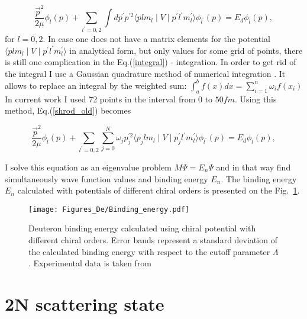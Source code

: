     \begin{equation}
        \frac{\vec{p}^2}{2\mu} \phi_l(p) +
        \sum_{l^\prime =0,2} \int d p^\prime p^{\prime 2} 
        \langle plm_l \mid V \mid p^\prime l^\prime m_l^\prime  \rangle
        \phi_{l^\prime}(p) = 
        E_d \phi_l(p),
        \label{integral}
    \end{equation}
    for $l=0,2$. In case one does not have a matrix elements for the potential 
    $\langle plm_l \mid V \mid p^\prime l^\prime m_l^\prime  \rangle$ in analytical form,
    but only values for some grid of points, 
    there is still one complication in the Eq.(\ref{integral}) - integration.
    In order to get rid of the integral I use a Gaussian quadrature 
    method of numerical integration \cite{jacobi1826ueber}.
    It allows to replace an integral by the weighted sum:
        $\int_a^b f(x)dx = \sum_{i=1}^n \omega_i f(x_i)$
    In current work I used 72 points in the interval from $0$ to $50 fm$. 
    Using this method, Eq.(\ref{shrod_old}) becomes  

    
    \begin{equation}
        \frac{\vec{p}^2}{2\mu} \phi_l(p) +
        \sum_{l^\prime =0,2}\sum_{j =0}^N  \omega_j p^{\prime 2}_j \langle p_jlm_l \mid V \mid p^\prime_j l^\prime m_l^\prime  \rangle
        \phi_{l^\prime}(p) = 
        E_d \phi_l(p),
        \label{integral2}
    \end{equation}

    I solve this equation as an eigenvalue problem $M\Psi = E_n \Psi$ and
    in that way
    find simultaneously wave function values and binding energy $E_n$. 
    The binding energy $E_n$ calculated with potentials of different chiral orders 
    is presented on the Fig.~\ref{bind}.

    \begin{figure}[h]
        \begin{center}
            \texttt{[image: Figures\_De/Binding\_energy.pdf]}
        \end{center}
        \caption{Deuteron binding energy calculated using chiral potential with different chiral orders.
        Error bands represent a standard deviation of the calculated binding energy with respect to
        the cutoff parameter $\Lambda$.
        Experimental data is taken from \cite{VANDERLEUN1982261}}
        \label{bind}
    \end{figure}

\section{2N scattering state}

